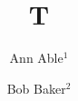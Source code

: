 \documentclass[aps,prl]{revtex4-1}

\title{T}
\author{Ann Able$^{1}$}
\author{Bob Baker$^{2}$}
\begin{abstract}Abs.\end{abstract}
\maketitle
Body.


